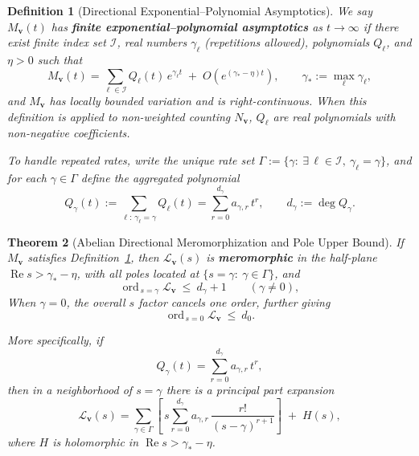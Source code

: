 \documentclass[11pt,a4paper]{article}
\newtheorem{theorem}{Theorem}[section]
\newtheorem{definition}[theorem]{Definition}
\theoremstyle{remark}
\DeclareMathOperator{\Re}{Re}
\DeclareMathOperator{\ord}{ord}
\begin{document}
\begin{definition}[Directional Exponential--Polynomial Asymptotics]\label{def:exppoly}
We say $M_{\mathbf{v}}(t)$ has \textbf{finite exponential--polynomial asymptotics} as $t\to\infty$ if there exist finite index set $\mathcal{I}$, real numbers $\gamma_\ell$ (repetitions allowed), polynomials $Q_\ell$, and $\eta>0$ such that
\begin{equation}
M_{\mathbf{v}}(t)=\sum_{\ell\in\mathcal{I}} Q_\ell(t)\,e^{\gamma_\ell t}
\;+\; O\left(e^{(\gamma_\ast-\eta)t}\right),\qquad \gamma_\ast:=\max_{\ell}\gamma_\ell ,
\end{equation}
and $M_{\mathbf{v}}$ has locally bounded variation and is right-continuous. When this definition is applied to non-weighted counting $N_{\mathbf{v}}$, $Q_\ell$ are real polynomials with non-negative coefficients.

To handle repeated rates, write the unique rate set $\Gamma:=\{\gamma:\ \exists\,\ell\in\mathcal{I},\ \gamma_\ell=\gamma\}$, and for each $\gamma\in\Gamma$ define the aggregated polynomial
\begin{equation}
Q_\gamma(t):=\sum_{\ell:\,\gamma_\ell=\gamma} Q_\ell(t)
=\sum_{r=0}^{d_\gamma} a_{\gamma,r}\,t^r,\qquad d_\gamma:=\deg Q_\gamma.
\end{equation}
\end{definition}

\begin{theorem}[Abelian Directional Meromorphization and Pole Upper Bound]\label{thm:abelian}
If $M_{\mathbf{v}}$ satisfies Definition~\ref{def:exppoly}, then $\mathcal{L}_{\mathbf{v}}(s)$ is \textbf{meromorphic} in the half-plane $\Re s>\gamma_\ast-\eta$, with all poles located at $\{s=\gamma:\ \gamma\in\Gamma\}$, and
\begin{equation}
\ord_{\,s=\gamma}\mathcal{L}_{\mathbf{v}}\ \le\ d_\gamma+1\qquad(\gamma\ne0),
\end{equation}
When $\gamma=0$, the overall $s$ factor cancels one order, further giving
\begin{equation}
\ord_{\,s=0}\mathcal{L}_{\mathbf{v}}\ \le\ d_0.
\end{equation}

More specifically, if
\begin{equation}
Q_\gamma(t)=\sum_{r=0}^{d_\gamma} a_{\gamma,r}\,t^r,
\end{equation}
then in a neighborhood of $s=\gamma$ there is a principal part expansion
\begin{equation}
\mathcal{L}_{\mathbf{v}}(s)
=\sum_{\gamma\in\Gamma}\left[\,s\sum_{r=0}^{d_\gamma} a_{\gamma,r}\,\frac{r!}{(s-\gamma)^{r+1}}\right]\;+\;H(s),
\end{equation}
where $H$ is holomorphic in $\Re s>\gamma_\ast-\eta$.
\end{theorem}
\end{document}
